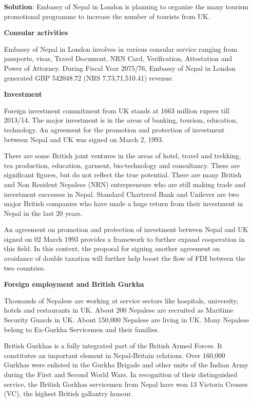 \documentclass[
  openany]{book}
\newenvironment{solution}{ {\bfseries Solution}:}{}
\begin{document}
\begin{solution}
Embassy of Nepal in London is planning to organize the many tourism promotional programme to increase the number of tourists from UK.

\textbf{Consular activities}

Embassy of Nepal in London involves in various consular service ranging from passports, visas, Travel Document, NRN Card, Verification, Attestation and Power of Attorney. During Fiscal Year 2075/76, Embassy of Nepal in London generated GBP 542048.72 (NRS 7,73,71,510.41) revenue.

\textbf{Investment}

Foreign investment commitment from UK stands at 1663 million rupees till 2013/14. The major investment is in the areas of banking, tourism, education, technology. An agreement for the promotion and protection of investment between Nepal and UK was signed on March 2, 1993.

There are some British joint ventures in the areas of hotel, travel and trekking, tea production, education, garment, bio-technology and consultancy. These are significant figures, but do not reflect the true potential. There are many British and Non Resident Nepalese (NRN) entrepreneurs who are still making trade and investment successes in Nepal. Standard Chartered Bank and Unilever are two major British companies who have made a huge return from their investment in Nepal in the last 20 years.

An agreement on promotion and protection of investment between Nepal and UK signed on 02 March 1993 provides a framework to further expand cooperation in this field. In this context, the proposal for signing another agreement on avoidance of double taxation will further help boost the flow of FDI between the two countries.

\textbf{Foreign employment and British Gurkha}

Thousands of Nepalese are working at service sectors like hospitals, university, hotels and restaurants in UK. About 200 Nepalese are recruited as Maritime Security Guards in UK. About 150,000 Nepalese are living in UK. Many Nepalese belong to Ex-Gurkha Servicemen and their families.

British Gurkhas is a fully integrated part of the British Armed Forces. It constitutes an important element in Nepal-Britain relations.  Over 160,000 Gurkhas were enlisted in the Gurkha Brigade and other units of the Indian Army during the First and Second World Wars. In recognition of their distinguished service, the British Gorkhas servicemen from Nepal have won 13 Victoria Crosses (VC), the highest British gallantry honour.


\end{solution}
\end{document}
